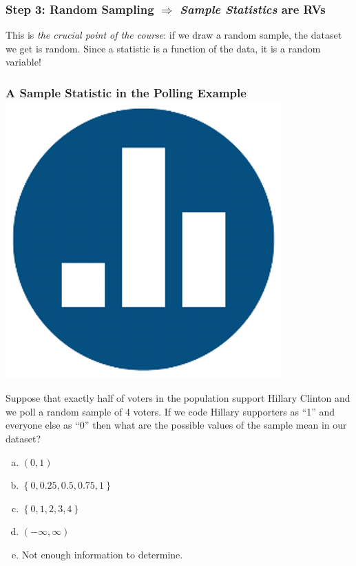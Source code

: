 \documentclass[handout]{beamer}
\begin{document}
\begin{frame}
  \frametitle{Step 3: Random Sampling $\Rightarrow$ \emph{Sample Statistics} are RVs} 

  \alert{This is \emph{the crucial point of the course}: if we draw a random sample, the dataset we get is random. Since a statistic is a function of the data, it is a random variable!} 
\end{frame}
\begin{frame}
  \frametitle{A Sample Statistic in the Polling Example \hfill\includegraphics[scale = 0.05]{./images/clicker}}
  Suppose that exactly half of voters in the population support Hillary Clinton and we poll a random sample of 4 voters. If we code Hillary supporters as ``1'' and everyone else as ``0'' then what are the possible values of the sample mean in our dataset?

  \vspace{1em}
  \begin{enumerate}[(a)]
    \item $(0,1)$
    \item $\left\{ 0, 0.25, 0.5, 0.75, 1 \right\}$
    \item $\left\{ 0,1,2,3,4 \right\}$
    \item $(-\infty, \infty)$
    \item Not enough information to determine.
  \end{enumerate}

\end{frame}
\end{document}
